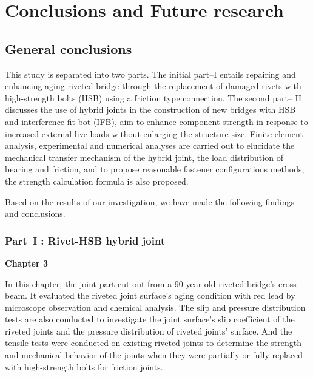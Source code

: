 \chapter{Conclusions and Future research}
\label{ch8}

\begin{spacing}{1.25} %
\minitoc %
\end{spacing} %
\onehalfspacing %

\section{General conclusions}

This study is separated into two parts. The initial part--\RN{1} entails repairing and enhancing aging riveted bridge through the replacement of damaged rivets with high-strength bolts (HSB) using a friction type connection. The second part-- \RN{2} discusses the use of hybrid joints in the construction of new bridges with HSB and interference fit bot (IFB), aim to enhance component strength in response to increased external live loads without enlarging the structure size. Finite element analysis, experimental and numerical analyses are carried out to elucidate the mechanical transfer mechanism of the hybrid joint, the load distribution of bearing and friction, and to propose reasonable fastener configurations methods, the strength calculation formula is also proposed.

Based on the results of our investigation, we have made the following findings and conclusions. \par

\subsection*{Part--\RN{1} : Rivet-HSB hybrid joint}

\textbf{Chapter 3}

In this chapter, the joint part cut out from a 90-year-old riveted bridge's cross-beam. It evaluated the riveted joint surface's aging condition with red lead by microscope observation and chemical analysis. The slip and pressure distribution tests are also conducted to investigate the joint surface's slip coefficient of the riveted joints and the pressure distribution of riveted joints' surface. And the tensile tests were conducted on existing riveted joints to determine the strength and mechanical behavior of the joints when they were partially or fully replaced with high-strength bolts for friction joints. 

